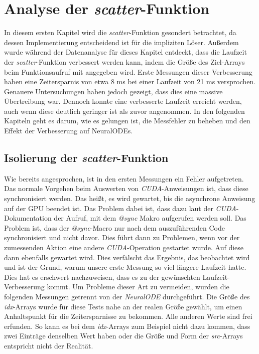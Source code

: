 
\section{Analyse der \textit{scatter}-Funktion} \label{sec:analyse_scatter}

In diesem ersten Kapitel wird die \textit{scatter}-Funktion gesondert betrachtet, da
dessen Implementierung entscheidend ist für die impliziten Löser.
Außerdem wurde während der Datenanalyse für dieses Kapitel entdeckt,
dass die Laufzeit der \textit{scatter}-Funktion verbessert werden kann, 
indem die Größe des Ziel-Arrays beim Funktionsaufruf mit angegeben wird.
Erste Messungen dieser Verbesserung haben eine Zeitersparnis von etwa 8 ms bei einer Laufzeit von 21 ms 
versprochen.
Genauere Untersuchungen haben jedoch gezeigt, dass dies eine massive Übertreibung war.
Dennoch konnte eine verbesserte Laufzeit erreicht werden, auch wenn diese deutlich geringer ist als zuvor angenommen.
In den folgenden Kapiteln geht es darum, wie es gelungen ist, die Messfehler zu beheben und den Effekt der Verbesserung auf NeuralODEs.


\subsection{Isolierung der \textit{scatter}-Funktion} \label{sec:isolation_of_the_scatter_funktion}

Wie bereits angesprochen, ist in den ersten Messungen ein Fehler aufgetreten.
Das normale Vorgehen beim Auswerten von \textit{CUDA}-Anweisungen ist, 
dass diese synchronisiert werden.
Das heißt, es wird gewartet, bis die asynchrone Anweisung auf der GPU beendet ist.
Das Problem dabei ist, dass dazu laut der \textit{CUDA}-Dokumentation der Aufruf, mit dem \textit{@sync} Makro aufgerufen werden soll.
Das Problem ist, dass der \textit{@sync}-Macro nur nach dem auszuführenden Code synchronisiert und nicht davor.
Dies führt dann zu Problemen, wenn vor der zumessenden Aktion eine andere \textit{CUDA}-Operation gestartet wurde.
Auf diese dann ebenfalls gewartet wird. 
Dies verfälscht das Ergebnis, das beobachtet wird und ist der Grund, warum unsere erste Messung so viel längere Laufzeit hatte.
Dies hat es erschwert nachzuweisen, dass es zu der gewünschten Laufzeit-Verbesserung kommt.
Um Probleme dieser Art zu vermeiden, wurden die folgenden Messungen getrennt von der \textit{NeuralODE} durchgeführt.
Die Größe des \textit{idx}-Arrays wurde für diese Tests nahe an der realen Größe gewählt, um einen Anhaltspunkt für die Zeitersparnisse zu bekommen.
Alle anderen Werte sind frei erfunden.
So kann es bei dem \textit{idx}-Arrays zum Beispiel nicht dazu kommen, 
dass zwei Einträge denselben Wert haben oder die Größe und Form der \textit{src}-Arrays entspricht nicht der Realität.

